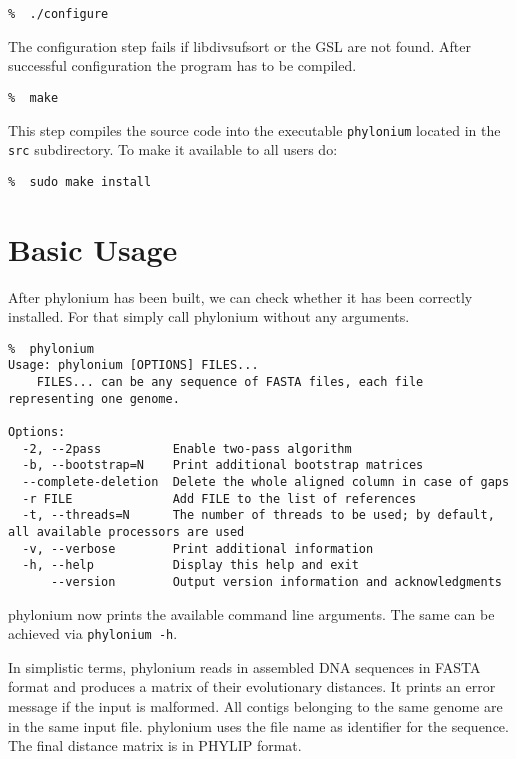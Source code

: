 \documentclass[a4paper,10pt,english]{scrartcl}
\newcommand{\tool}[1]{\textsf{#1}}
\newcommand{\phylonium}{\textsf{phylonium}\xspace}
\begin{document}
\begin{lstlisting}
%  ./configure
\end{lstlisting}

The configuration step fails if \tool{libdivsufsort} or the \tool{GSL} are not found. After successful configuration the program has to be compiled.

\begin{lstlisting}
%  make
\end{lstlisting}

This step compiles the source code into the executable \lstinline!phylonium! located in the \lstinline!src! subdirectory. To make it available to all users do:

\begin{lstlisting}
%  sudo make install
\end{lstlisting}


\section{Basic Usage}

After \phylonium has been built, we can check whether it has been correctly installed. For that simply call \phylonium without any arguments.

\begin{lstlisting}
%  phylonium
Usage: phylonium [OPTIONS] FILES...
	FILES... can be any sequence of FASTA files, each file representing one genome.

Options:
  -2, --2pass          Enable two-pass algorithm
  -b, --bootstrap=N    Print additional bootstrap matrices
  --complete-deletion  Delete the whole aligned column in case of gaps
  -r FILE              Add FILE to the list of references
  -t, --threads=N      The number of threads to be used; by default, all available processors are used
  -v, --verbose        Print additional information
  -h, --help           Display this help and exit
      --version        Output version information and acknowledgments
\end{lstlisting}

\phylonium now prints the available command line arguments. The same can be achieved via \lstinline!phylonium -h!.

In simplistic terms, \phylonium reads in assembled DNA sequences in FASTA format and produces a matrix of their evolutionary distances. It prints an error message if the input is malformed. All contigs belonging to the same genome are in the same input file. \phylonium uses the file name as identifier for the sequence. The final distance matrix is in PHYLIP format.
\end{document}
